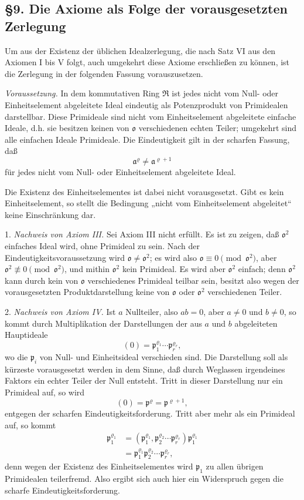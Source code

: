 \documentclass[11pt]{article}
\providecommand{\mR}{\mathfrak{R}}
\providecommand{\ma}{\mathfrak{a}}
\providecommand{\mo}{\mathfrak{o}}
\providecommand{\mpideal}{\mathfrak{p}}
\begin{document}
\subsection*{§9. Die Axiome als Folge der vorausgesetzten Zerlegung}

Um aus der Existenz der üblichen Idealzerlegung, die nach Satz VI aus den Axiomen I bis V folgt, auch umgekehrt diese Axiome erschließen zu können, ist die Zerlegung in der folgenden Fassung vorauszusetzen.

\emph{Voraussetzung.} In dem kommutativen Ring $\mR$ ist jedes nicht vom Null- oder Einheitselement abgeleitete Ideal eindeutig als Potenzprodukt von Primidealen darstellbar. Diese Primideale sind nicht vom Einheitselement abgeleitete einfache Ideale, d.h. sie besitzen keinen von $\mo$ verschiedenen echten Teiler; umgekehrt sind alle einfachen Ideale Primideale. Die Eindeutigkeit gilt in der scharfen Fassung, daß
\[
        \ma^\varrho\ne\ma^{\varrho+1}
\]
für jedes nicht vom Null- oder Einheitselement abgeleitete Ideal.

Die Existenz des Einheitselementes ist dabei nicht vorausgesetzt. Gibt es kein Einheitselement, so stellt die Bedingung „nicht vom Einheitselement abgeleitet“ keine Einschränkung dar.

1. \emph{Nachweis von Axiom III.} Sei Axiom III nicht erfüllt. Es ist zu zeigen, daß $\mo^2$ einfaches Ideal wird, ohne Primideal zu sein. Nach der Eindeutigkeitsvoraussetzung wird $\mo\ne\mo^2$; es wird also $\mo\equiv0\pmod{\mo^2}$, aber $\mo^2\not\equiv0\pmod{\mo^2}$, und mithin $\mo^2$ kein Primideal. Es wird aber $\mo^2$ einfach; denn $\mo^2$ kann durch kein von $\mo$ verschiedenes Primideal teilbar sein, besitzt also wegen der vorausgesetzten Produktdarstellung keine von $\mo$ oder $\mo^2$ verschiedenen Teiler.

2. \emph{Nachweis von Axiom IV.} Ist $a$ Nullteiler, also $ab=0$, aber $a\ne0$ und $b\ne0$, so kommt durch Multiplikation der Darstellungen der aus $a$ und $b$ abgeleiteten Hauptideale
\[
        (0)=\mpideal_1^{\varrho_1}\cdots\mpideal_r^{\varrho_r},
\]
wo die $\mpideal_i$ von Null- und Einheitsideal verschieden sind. Die Darstellung soll als kürzeste vorausgesetzt werden in dem Sinne, daß durch Weglassen irgendeines Faktors ein echter Teiler der Null entsteht. Tritt in dieser Darstellung nur ein Primideal auf, so wird
\[
        (0)=\mpideal^\varrho=\mpideal^{\varrho+1},
\]
entgegen der scharfen Eindeutigkeitsforderung. Tritt aber mehr als ein Primideal auf, so kommt
\[
\begin{aligned}
\mpideal_1^{\varrho_1}
 &= (\mpideal_1^{\varrho_1},\mpideal_2^{\varrho_2}\cdots\mpideal_r^{\varrho_r})\mpideal_1^{\varrho_1}  \\
 &= \mpideal_1^{\varrho_1}\mpideal_2^{\varrho_2}\cdots\mpideal_r^{\varrho_r},
\end{aligned}
\]
denn wegen der Existenz des Einheitselementes wird $\mpideal_1$ zu allen übrigen Primidealen teilerfremd. Also ergibt sich auch hier ein Widerspruch gegen die scharfe Eindeutigkeitsforderung.
\end{document}

